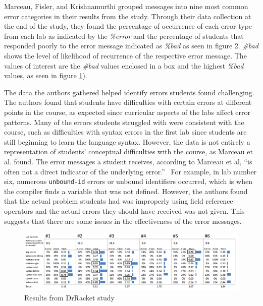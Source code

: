 \documentclass{sig-alternate}
\begin{document}

Marceau, Fisler, and Krishnamurthi grouped messages into nine most common error categories in their results from the study.
Through their data collection at the end of the study, they found the percentage of occurrence of each error type from each lab as indicated by the \textit{\%error} and the percentage of students that responded poorly to the error message indicated as \textit{\%bad} as seen in figure 2.
\textit{\#bad} shows the level of likelihood of recurrence of the respective error message.
The values of interest are the \textit{\#bad} values enclosed in a box and the highest \textit{\%bad} values, as seen in figure \ref{fig:drracketstudy}). 

The data the authors gathered helped identify errors students found challenging.
The authors found that students have difficulties with certain errors at different points in the course, as expected since curricular aspects of the labs affect error patterns.
Many of the errors students struggled with were consistent with the course, such as difficulties with syntax errors in the first lab since students are still beginning to learn the language syntax.
However, the data is not entirely a representation of students' conceptual difficulties with the course, as Marceau et al. found.
The error messages a student receives, according to Marceau et al, ``is often not a direct indicator of the underlying error.''~\cite{Marceau:2011:MEE:1953163.1953308}
For example, in lab number six, numerous \texttt{unbound-id} errors  or unbound identifiers occurred, which is when the compiler finds a variable that was not defined.
However, the authors found that the actual problem students had was improperly using field reference operators and the actual errors they should have received was not given.
This suggests that there are some issues in the effectiveness of the error messages.

\begin{figure}
  \centering
  \includegraphics[keepaspectratio, width=\textwidth]{MEE_Data.png}
  \caption{Results from DrRacket study}
  \label{fig:drracketstudy}
\end{figure}
\end{document}
